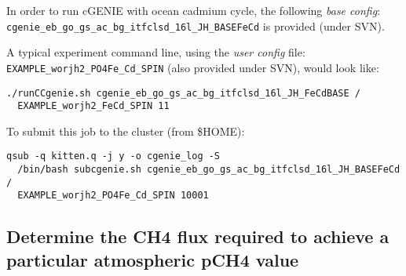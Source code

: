 \documentclass[10pt,twoside]{article}
\begin{document}
In order to run cGENIE with ocean cadmium cycle, the following \textit{base config}: \\ \texttt{cgenie\_eb\_go\_gs\_ac\_bg\_itfclsd\_16l\_JH\_BASEFeCd} is provided (under SVN).

A typical experiment command line, using the \textit{user config} file: \texttt{EXAMPLE\_worjh2\_PO4Fe\_Cd\_SPIN} (also provided under SVN), would look like:
\vspace{-5.5pt}\begin{verbatim}
./runCCgenie.sh cgenie_eb_go_gs_ac_bg_itfclsd_16l_JH_FeCdBASE /
  EXAMPLE_worjh2_FeCd_SPIN 11
\end{verbatim}\vspace{-5.5pt}

To submit this job to the cluster (from \$HOME):
\vspace{-5.5pt}\begin{verbatim}
qsub -q kitten.q -j y -o cgenie_log -S
  /bin/bash subcgenie.sh cgenie_eb_go_gs_ac_bg_itfclsd_16l_JH_BASEFeCd /
  EXAMPLE_worjh2_PO4Fe_Cd_SPIN 10001
\end{verbatim}\vspace{-5.5pt}


\subsection{Determine the CH4 flux required to achieve a particular atmospheric pCH4 value}
\end{document}
